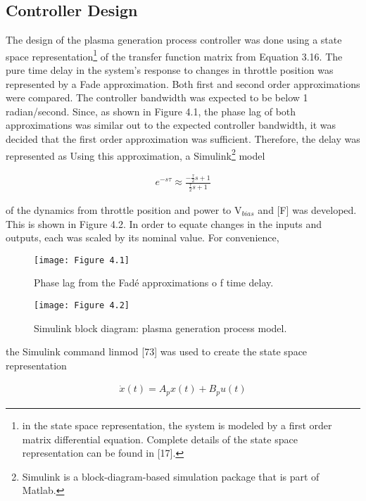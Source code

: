 \subsection{Controller Design}

\tab The design of the plasma generation process controller was done using a state space representation\footnote{in the state space representation, the system is modeled by a first order matrix differential equation. Complete details of the state space representation can be found in [17].} of the transfer function matrix from Equation 3.16. The pure time delay in the system’s response to changes in throttle position was represented by a Fade approximation. Both first and second order approximations were compared. The controller bandwidth was expected to be below 1 radian/second. Since, as shown in Figure 4.1, the phase lag of both approximations was similar out to the expected controller bandwidth, it was decided that the first order approximation was sufficient. Therefore, the delay was represented as Using this approximation, a Simulink\footnote{Simulink is a block-diagram-based simulation package that is part of Matlab.} model

\begin{align}
	e^{-s\tau} \approx \frac{-\frac{\tau}{2} s +1}{\frac{\tau}{2} s +1}
\end{align}

\noindent of the dynamics from throttle position and
power to $\text{V}_{bias}$ and [F] was developed. This is shown in Figure 4.2. In order to equate changes in the inputs and outputs, each was scaled by its nominal value. For convenience,

\begin{figure}[H]
	\centering
	\texttt{[image: Figure 4.1]}
	\bf\caption{ Phase lag from the Fad\'{e} approximations o f time delay.}
	\label{fig:4.1}
\end{figure}

\begin{figure}[H]
	\centering
	\texttt{[image: Figure 4.2]}
	\bf\caption{ Simulink block diagram: plasma generation process model.}
	\label{fig:4.2}
\end{figure}

\noindent the Simulink command linmod [73] was used to create the state space representation

\begin{align*}
	\dot x(t) = A_{p} x(t) + B_{p}u(t)
\end{align*}


